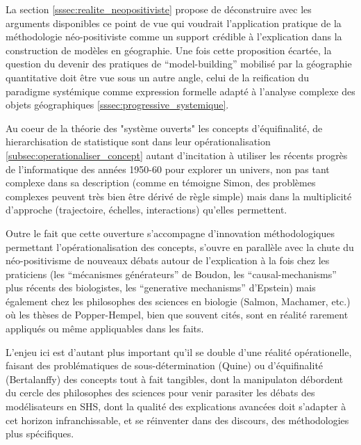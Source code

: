 La section \ref{sssec:realite_neopositiviste} propose de déconstruire avec les arguments disponibles ce point de vue qui voudrait l'application pratique de la méthodologie néo-positiviste comme un support crédible à l'explication dans la construction de modèles en géographie. Une fois cette proposition écartée, la question du devenir des pratiques de \foreignquote{english}{model-building} mobilisé par la géographie quantitative doit être vue sous un autre angle, celui de la reification du paradigme systémique comme expression formelle adapté à l'analyse complexe des objets géographiques \ref{sssec:progressive_systemique}.

Au coeur de la théorie des "système ouverts" les concepts d'équifinalité, de hierarchisation de statistique sont dans leur opérationalisation \ref{subsec:operationaliser_concept} autant d'incitation à utiliser les récents progrès de l'informatique des années 1950-60 pour explorer un univers, non pas tant complexe dans sa description (comme en témoigne Simon, des problèmes complexes peuvent très bien être dérivé de règle simple) mais dans la multiplicité d'approche (trajectoire, échelles, interactions) qu'elles permettent.

Outre le fait que cette ouverture s'accompagne d'innovation méthodologiques permettant l'opérationalisation des concepts, s'ouvre en parallèle avec la chute du néo-positivisme de nouveaux débats autour de l'explication \autocite{Hedstrom2010} à la fois chez les praticiens (les \enquote{mécanismes générateurs} de Boudon, les \foreignquote{english}{causal-mechanisms} plus récents des biologistes, les \foreignquote{english}{generative mechanisms} d'Epstein) mais également chez les philosophes des sciences en biologie (Salmon, Machamer, etc.) où les thèses de Popper-Hempel, bien que souvent cités, sont en réalité rarement appliqués ou même appliquables dans les faits. \autocite{Bechet2013} 

L'enjeu ici est d'autant plus important qu'il se double d'une réalité opérationelle, faisant des problématiques de sous-détermination (Quine) ou d'équifinalité (Bertalanffy) des concepts tout à fait tangibles, dont la manipulaton débordent du cercle des philosophes des sciences pour venir parasiter les débats des modélisateurs en SHS, dont la qualité des explications avancées doit s'adapter à cet horizon infranchissable, et se réinventer dans des discours, des méthodologies plus spécifiques.



